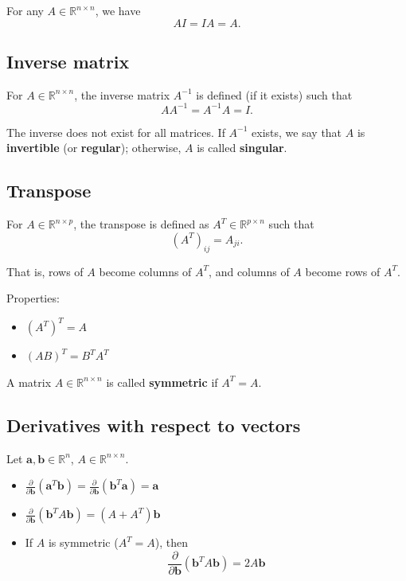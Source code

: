 \documentclass{article}
\theoremstyle{remark}
\theoremstyle{definition}
\begin{document}
	For any $A \in \mathbb{R}^{n \times n}$, we have
	$$
	AI = IA = A.
	$$
	
	\subsection*{Inverse matrix}
	
	For $A \in \mathbb{R}^{n \times n}$, the inverse matrix $A^{-1}$ is defined (if it exists) such that
	$$
	AA^{-1} = A^{-1}A = I.
	$$
	
	The inverse does not exist for all matrices. If $A^{-1}$ exists, we say that $A$ is \textbf{invertible} (or \textbf{regular}); otherwise, $A$ is called \textbf{singular}.
	
	\subsection*{Transpose}
	
	For $A \in \mathbb{R}^{n \times p}$, the transpose is defined as $A^T \in \mathbb{R}^{p \times n}$ such that
	$$
	(A^T)_{ij} = A_{ji}.
	$$
	
	That is, rows of $A$ become columns of $A^T$, and columns of $A$ become rows of $A^T$.
	
	Properties:
	\begin{itemize}
		\item $(A^T)^T = A$
		\item $(AB)^T = B^T A^T$
	\end{itemize}
	
	A matrix $A \in \mathbb{R}^{n \times n}$ is called \textbf{symmetric} if $A^T = A$.
	
	\subsection*{Derivatives with respect to vectors}
	
	Let $\bm{a}, \bm{b} \in \mathbb{R}^n$, $A \in \mathbb{R}^{n \times n}$.
	
	\begin{itemize}
		\item $\frac{\partial}{\partial \bm{b}} \left( \bm{a}^T \bm{b} \right)
		= \frac{\partial}{\partial \bm{b}} \left( \bm{b}^T \bm{a} \right)
		= \bm{a}$
		
		\item $\frac{\partial}{\partial \bm{b}} \left( \bm{b}^T A \bm{b} \right)
		= (A + A^T)\bm{b}$
		
		\item If $A$ is symmetric ($A^T = A$), then
		$$
		\frac{\partial}{\partial \bm{b}} \left( \bm{b}^T A \bm{b} \right)
		= 2A\bm{b}
		$$
	\end{itemize}
	
\end{document}
